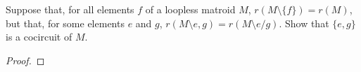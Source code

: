 \prob
{
	Suppose that, for all elements $f$ of a loopless matroid $M$, $r(M\setminus \{f\}) = r(M)$, but that,
	for some elements $e$ and $g$, $r(M \setminus e, g) = r(M \setminus e / g)$. Show that $\{e, g\}$
	is a cocircuit of $M$.
}
\begin{proof}
    
\end{proof}